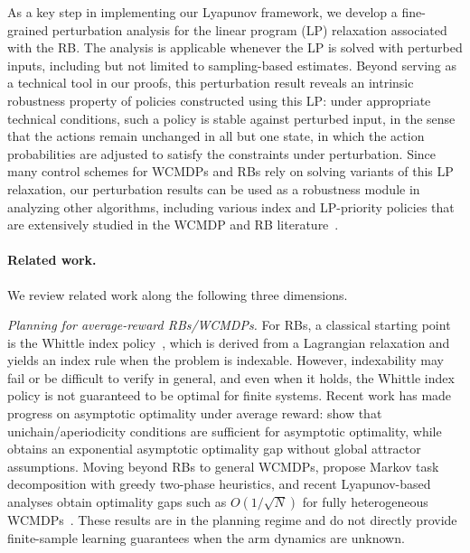\documentclass[mnsc,nonblindrev]{informs3}
\begin{document}
As a key step in implementing our Lyapunov framework, we develop a fine-grained perturbation analysis for the linear program (LP) relaxation associated with the RB. The analysis is applicable whenever the LP is solved with perturbed inputs, including but not limited to sampling-based estimates. Beyond serving as a technical tool in our proofs, this perturbation result reveals an intrinsic robustness property of policies constructed using this LP: under appropriate technical conditions, such a policy is stable against perturbed input, in the sense that the actions remain unchanged in all but one state, in which the action probabilities are adjusted to satisfy the constraints under perturbation. Since many control schemes for WCMDPs and RBs rely on solving variants of this LP relaxation, our perturbation results can be used as a robustness module in analyzing other algorithms, including various index and LP-priority policies that are extensively studied in the WCMDP and RB literature~\citep{weber1990index,verloop2016asymptotically,Gast_2024,hodge2015asymptotic}.



\vspace{-0.00cm}

\paragraph{Related work.}
We review related work along the following three dimensions.

\emph{Planning for average-reward RBs/WCMDPs.}
For RBs, a classical starting point is the Whittle index policy~\citep{whittle1988restless,weber1990index}, which is derived from a Lagrangian relaxation and yields an index rule when the problem is indexable. However, indexability may fail or be difficult to verify in general, and even when it holds, the Whittle index policy is not guaranteed to be optimal for finite systems. Recent work has made progress on asymptotic optimality under average reward: \citet{hong2024unichain} show that unichain/aperiodicity conditions are sufficient for asymptotic optimality, while \citet{hong2024achieving} obtains an exponential asymptotic optimality gap without global attractor assumptions. Moving beyond RBs to general WCMDPs, \citet{meuleau1998solving} propose Markov task decomposition with greedy two-phase heuristics, and recent Lyapunov-based analyses obtain optimality gaps such as $O(1/\sqrt N)$ for fully heterogeneous WCMDPs~\citep{zhang2025projection}. These results are in the planning regime and do not directly provide finite-sample learning guarantees when the arm dynamics are unknown.
\end{document}
